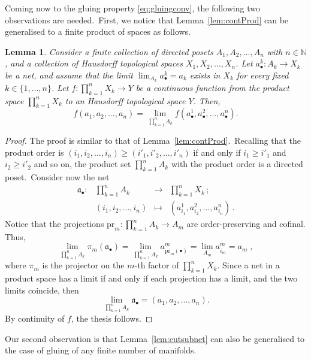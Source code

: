 \documentclass[11pt]{article}
\newcommand{\N}{\mathbb{N}}
\newtheorem{lemma}[proposition]{Lemma}
\theoremstyle{definition}
\numberwithin{equation}{section}
\begin{document}
Coming now to the gluing property \eqref{eq:gluingconv}, the following two observations are needed.~First, we notice that Lemma~\ref{lem:contProd} can be generalised to a finite product of spaces as follows.
\begin{lemma}\label{lem:gen_contProd}
    Consider a finite collection of directed posets $A_1,A_2,\dots,A_n$ with $n\in\N$, and a collection of Hausdorff topological spaces $X_1,X_2,\dots,X_n$. Let $a_\bullet^k:A_k\to X_k$ be a net, and assume that the limit $\lim_{A_k}a_\bullet^k=a_k$ exists in $X_k$ for every fixed $k\in\{1,\dots,n\}$. Let $f:\prod_{k=1}^nX_k\to Y$ be a continuous function from the product space $\prod_{k=1}^nX_k$ to an Hausdorff topological space $Y$. Then,
    \begin{equation*}
        f(a_1,a_2,\dots,a_n)=\lim_{\prod_{k=1}^nA_k}f(a_\bullet^1,a_\bullet^2,\dots,a_\bullet^n).
    \end{equation*}
\end{lemma}
\begin{proof}
    The proof is similar to that of Lemma~\ref{lem:contProd}.~Recalling that the product order is $(i_1,i_2,\dots,i_n)\geq (i'_1,i'_2,\dots,i'_n)$ if and only if $i_1\geq i'_1$ and $i_2\geq i'_2$ and so on, the product set $\prod_{k=1}^n A_k$ with the product order is a directed poset.~Consider now the net 
    \begin{equation*}
        \begin{matrix}
            \mathfrak{a}_\bullet: & \prod_{k=1}^n A_k &\to&\prod_{k=1}^n X_k\,;\\
            & (i_1,i_2,\dots,i_n)&\mapsto&(a_{i_1}^1,a^2_{i_2},\dots,a^n_{i_n})\,.
        \end{matrix}
    \end{equation*}
    Notice that the projections $\mathrm{pr}_m:\prod_{k=1}^n A_k\to A_m$ are order-preserving and cofinal. Thus,
    \begin{equation*}
    \lim_{\prod_{k=1}^nA_k}\pi_m(\mathfrak{a}_\bullet)=\lim_{\prod_{k=1}^nA_k}a^m_{\mathrm{pr}_m(\bullet)}=\lim_{A_m}a^m_{i_m}=a_m\;,
    \end{equation*}
    where $\pi_{m}$ is the projector on the $m$-th factor of $\prod_{k=1}^nX_k$. Since a net in a product space has a limit if and only if each projection has a limit, and the two limits coincide, then \[\lim_{\prod_{k=1}^nA_k}\mathfrak{a}_\bullet=(a_1,a_2,\dots,a_n).\]
    By continuity of $f$, the thesis follows.
\end{proof}
Our second observation is that Lemma~\ref{lem:cutsubnet} can also be generalised to the case of gluing of any finite number of manifolds.
\end{document}
